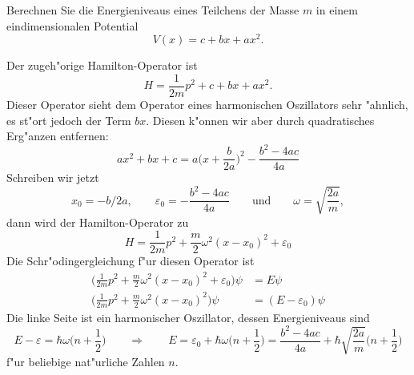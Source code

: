 Berechnen Sie die Energieniveaus eines Teilchens der Masse $m$ in einem
eindimensionalen Potential
\[
V(x)=c+bx+ax^2.
\]

\begin{loesung}
Der zugeh"orige Hamilton-Operator ist
\[
H=\frac1{2m}p^2 + c+bx+ax^2.
\]
Dieser Operator sieht dem Operator eines harmonischen Oszillators sehr
"ahnlich, es st"ort jedoch der Term $bx$.
Diesen k"onnen wir aber durch quadratisches Erg"anzen entfernen:
\[
ax^2+bx+c
=
a\biggl(x+\frac{b}{2a}\biggr)^2-\frac{b^2-4ac}{4a}
\]
Schreiben wir jetzt
\[
x_0=-b/2a,\qquad
\varepsilon_0=-\frac{b^2-4ac}{4a}
\qquad\text{und}\qquad
\omega=\sqrt{\frac{2a}{m}},
\]
dann wird der Hamilton-Operator zu
\[
H=\frac1{2m}p^2 +
\frac{m}{2}\omega^2(x-x_0)^2
+\varepsilon_0
\]
Die Schr"odingergleichung f"ur diesen Operator ist
\begin{align*}
\biggl(
\frac1{2m}p^2 +
\frac{m}{2}\omega^2(x-x_0)^2
+\varepsilon_0
\biggr)\psi&=E\psi
\\
\biggl(
\frac1{2m}p^2 +
\frac{m}{2}\omega^2(x-x_0)^2
\biggr)\psi&=(E-\varepsilon_0)\psi
\end{align*}
Die linke Seite ist ein harmonischer Oszillator, dessen Energieniveaus
sind
\[
E-\varepsilon=\hbar\omega\biggl(n+\frac12\biggr)
\qquad\Rightarrow\qquad
E=\varepsilon_0+\hbar\omega\biggl(n+\frac12\biggr)
=\frac{b^2-4ac}{4a}+\hbar\sqrt{\frac{2a}{m}}\biggl(n+\frac12\biggr)
\]
f"ur beliebige nat"urliche Zahlen $n$.
\end{loesung}

